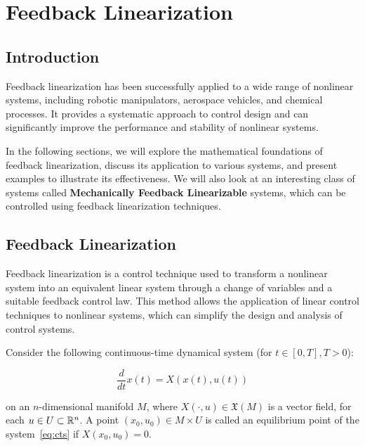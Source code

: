 \chapter{Feedback Linearization}

\section{Introduction}

Feedback linearization has been successfully applied to a wide range of nonlinear systems, including robotic manipulators, aerospace vehicles, and chemical processes. It provides a systematic approach to control design and can significantly improve the performance and stability of nonlinear systems.

In the following sections, we will explore the mathematical foundations of feedback linearization, discuss its application to various systems, and present examples to illustrate its effectiveness. We will also look at an interesting class of systems called \textbf{Mechanically Feedback Linearizable} systems, which can be controlled using feedback linearization techniques.

\section{Feedback Linearization}

Feedback linearization is a control technique used to transform a nonlinear system into an equivalent linear system through a change of variables and a suitable feedback control law. This method allows the application of linear control techniques to nonlinear systems, which can simplify the design and analysis of control systems.

Consider the following continuous-time dynamical system (for $t \in [0, T ], T > 0$):

\begin{equation}
    \label{eq:cts}
    \dfrac{d}{dt}x(t) = X(x(t), u(t))
\end{equation}

on an $n$-dimensional manifold $M$, where $X(\cdot, u) \in \mathfrak{X}(M)$ is a vector field, for each $u \in U \subset \R[n]$. A point $(x_0, u_0) \in M \times U$ is called an equilibrium point of the system~\eqref{eq:cts} if $X(x_0, u_0) = 0$.

